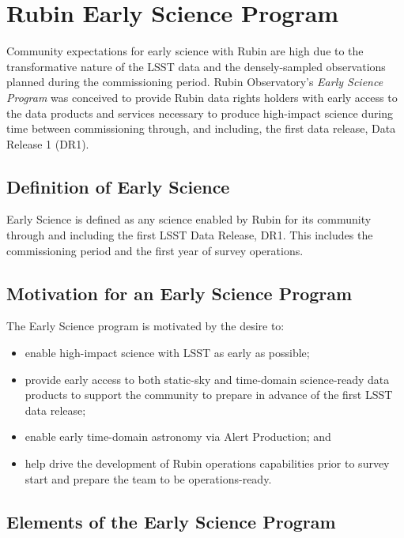 \section{Rubin Early Science Program}

Community expectations for early science with Rubin are high due to the transformative nature of the LSST data and the densely-sampled observations planned during the commissioning period.
Rubin Observatory's \emph{Early Science Program} was conceived to provide Rubin data rights holders with early access to the data products and services necessary to produce high-impact  science during time between commissioning through, and including, the first data release, Data Release 1 (DR1). 

\subsection{Definition of Early Science}  \label{ssec:defn}
Early Science is defined as any science enabled by Rubin for its community through and including the first LSST Data Release, DR1.
 This includes the commissioning period and the first year of survey operations.

\subsection{Motivation for an Early Science Program}  \label{ssec:motivation}

The Early Science program is motivated by the desire to:
\begin{itemize}
\item enable high-impact science with LSST as early as possible;
\item provide early access to both static-sky and time-domain science-ready data products to support the community to prepare in advance of the first LSST data release;
\item enable early time-domain astronomy via Alert Production; and 
\item help drive the development of Rubin operations capabilities prior to survey start and prepare the team to be operations-ready.
\end{itemize}

\subsection{Elements of the Early Science Program}

